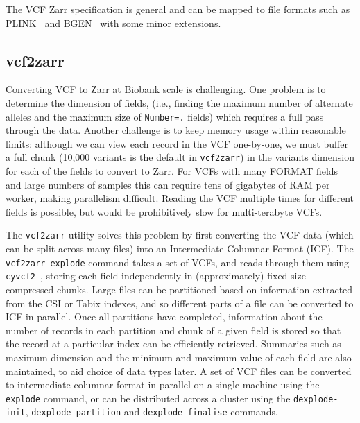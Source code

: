 \documentclass[a4paper,num-refs]{oup-contemporary}
\begin{document}
The VCF Zarr specification is general and can be mapped to
file formats such as PLINK~\citep{purcell2007plink,chang2015second}
and BGEN~\citep{band2018bgen} with some minor extensions.

\subsection{vcf2zarr}
Converting VCF to Zarr at Biobank scale is challenging.
One problem is to determine the dimension of fields,
(i.e., finding the maximum number of alternate alleles and the
maximum size of \texttt{Number=.} fields) which requires a full
pass through the data. Another challenge is to keep
memory usage within reasonable limits: although
we can view each record in the VCF one-by-one,
we must buffer a full chunk (10,000 variants is the default in
\texttt{vcf2zarr})
in the variants dimension for each of the fields to convert to Zarr.
For VCFs with many FORMAT fields and large numbers of samples this can
require tens of gigabytes of RAM per worker, making
parallelism difficult. Reading the VCF multiple times for different fields
is possible, but would be prohibitively slow for multi-terabyte VCFs.

The \texttt{vcf2zarr} utility solves this problem by first converting
the VCF data (which can be split across many files) into an Intermediate
Columnar Format (ICF). The \texttt{vcf2zarr explode} command takes a set
of VCFs, and reads through them using
\texttt{cyvcf2}~\cite{pedersen2017cyvcf2},
storing each field independently in (approximately) fixed-size
compressed chunks.
Large files can be partitioned based on information extracted from the
CSI or Tabix indexes, and so different parts of a file can be
converted to ICF in parallel.
Once all partitions have completed, information about
the number of records in each partition and chunk of a given
field is stored so that the record at a particular index
can be efficiently retrieved.
Summaries such as maximum dimension and the minimum and maximum value
of each field are also maintained, to aid choice of data types later.
A set of VCF files can be converted to intermediate columnar
format in parallel on a single machine
using the \texttt{explode} command,
or can be distributed across a cluster using the
\texttt{dexplode-init},
\texttt{dexplode-partition} and \texttt{dexplode-finalise} commands.
\end{document}

